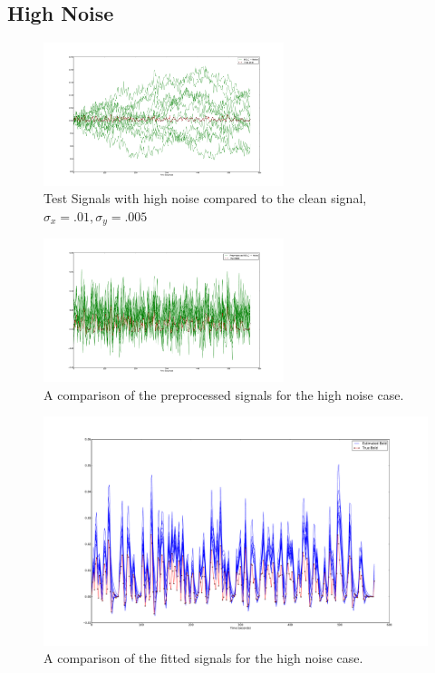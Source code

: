 \subsection{High Noise}
\label{sec:HighNoise}
\begin{figure}
\includegraphics[clip=true,trim=6cm 2cm 6cm 3.5cm,width=7cm]{images/realization_highnoise}
\caption{Test Signals with high noise compared to the clean signal, $\sigma_x = .01, \sigma_y=.005$}
\label{fig:HighNoiseRealization}
\end{figure}
\begin{figure}
\includegraphics[clip=true,trim=6cm 2cm 6cm 3.5cm,width=7cm]{images/preprocessed_highnoise}
\caption{A comparison of the preprocessed signals for the high noise case.}
\label{fig:PreprocessedHighNoise}
\end{figure}
\begin{figure}
\includegraphics[clip=true,trim=6cm 2cm 6cm 3.5cm,width=17cm]{images/comparison_highnoise}
\caption{A comparison of the fitted signals for the high noise case.}
\label{fig:FitComparisonHighNoise}
\end{figure}
